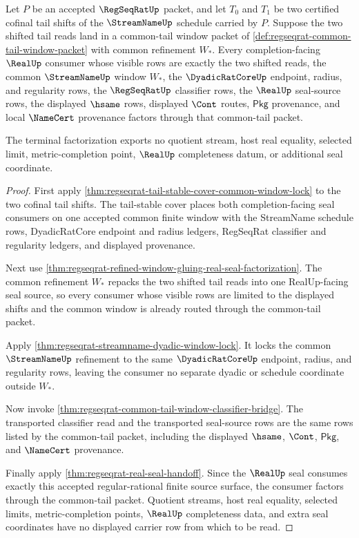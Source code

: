 \begin{theorem}
\label{thm:regseqrat-common-tail-window-terminality}
Let $P$ be an accepted $\RegSeqRatUp$ packet, and let $T_0$ and $T_1$ be two certified cofinal tail shifts of the $\StreamNameUp$ schedule carried by $P$. Suppose the two shifted tail reads land in a common-tail window packet of \autoref{def:regseqrat-common-tail-window-packet} with common refinement $W_\ast$. Every completion-facing $\RealUp$ consumer whose visible rows are exactly the two shifted reads, the common $\StreamNameUp$ window $W_\ast$, the $\DyadicRatCoreUp$ endpoint, radius, and regularity rows, the $\RegSeqRatUp$ classifier rows, the $\RealUp$ seal-source rows, the displayed $\hsame$ rows, displayed $\Cont$ routes, $\mathsf{Pkg}$ provenance, and local $\NameCert$ provenance factors through that common-tail packet.

The terminal factorization exports no quotient stream, host real equality, selected limit, metric-completion point, $\RealUp$ completeness datum, or additional seal coordinate.
\end{theorem}
\begin{proof}
First apply \autoref{thm:regseqrat-tail-stable-cover-common-window-lock} to the two cofinal tail shifts. The tail-stable cover places both completion-facing seal consumers on one accepted common finite window with the StreamName schedule rows, DyadicRatCore endpoint and radius ledgers, RegSeqRat classifier and regularity ledgers, and displayed provenance.

Next use \autoref{thm:regseqrat-refined-window-gluing-real-seal-factorization}. The common refinement $W_\ast$ repacks the two shifted tail reads into one RealUp-facing seal source, so every consumer whose visible rows are limited to the displayed shifts and the common window is already routed through the common-tail packet.

Apply \autoref{thm:regseqrat-streamname-dyadic-window-lock}. It locks the common $\StreamNameUp$ refinement to the same $\DyadicRatCoreUp$ endpoint, radius, and regularity rows, leaving the consumer no separate dyadic or schedule coordinate outside $W_\ast$.

Now invoke \autoref{thm:regseqrat-common-tail-window-classifier-bridge}. The transported classifier read and the transported seal-source rows are the same rows listed by the common-tail packet, including the displayed $\hsame$, $\Cont$, $\mathsf{Pkg}$, and $\NameCert$ provenance.

Finally apply \autoref{thm:regseqrat-real-seal-handoff}. Since the $\RealUp$ seal consumes exactly this accepted regular-rational finite source surface, the consumer factors through the common-tail packet. Quotient streams, host real equality, selected limits, metric-completion points, $\RealUp$ completeness data, and extra seal coordinates have no displayed carrier row from which to be read.
\end{proof}

